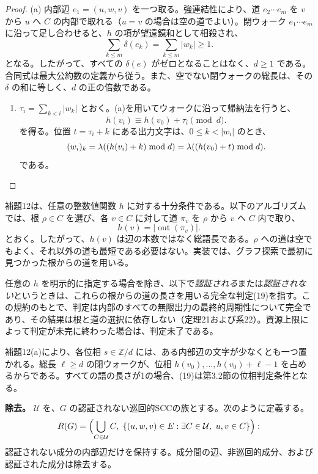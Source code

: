 \documentclass[11pt,reqno]{amsart}
\theoremstyle{definition}
\theoremstyle{definition}
\theoremstyle{remark}
\providecommand{\tightlist}{\setlength{\itemsep}{0pt}\setlength{\parskip}{0pt}}
\begin{document}
\begin{proof}\leavevmode\label{proof:12}
(a) 内部辺 \(e_1=(u,w,v)\) を一つ取る。強連結性により、道 \(e_2\cdots e_m\) を \(v\) から \(u\) へ \(C\) の内部で取れる（\(u=v\) の場合は空の道でよい）。閉ウォーク \(e_1\cdots e_m\) に沿って足し合わせると、\(h\) の項が望遠鏡和として相殺され、
\[
\sum_{k\le m}\delta(e_k)=\sum_{k\le m}|w_k|\ge1.
\]
となる。したがって、すべての \(\delta(e)\) がゼロとなることはなく、\(d\ge1\) である。合同式は最大公約数の定義から従う。また、空でない閉ウォークの総長は、その \(\delta\) の和に等しく、\(d\) の正の倍数である。

\begin{enumerate}
\def\labelenumi{(\alph{enumi})}
\setcounter{enumi}{1}
\tightlist
\item
  \(\tau_i=\sum_{k<i}|w_k|\) とおく。(a)を用いてウォークに沿って帰納法を行うと、
  \[
  h(v_i)\equiv h(v_0)+\tau_i\pmod d.
  \]
  を得る。位置 \(t=\tau_i+k\) にある出力文字は、\(0\le k<|w_i|\) のとき、
  \[
  (w_i)_k=\lambda((h(v_i)+k)\bmod d)=\lambda((h(v_0)+t)\bmod d).\qedhere
\]
  である。
\end{enumerate}
\end{proof}

補題12は、任意の整数値関数 \(h\) に対する十分条件である。以下のアルゴリズムでは、根 \(\rho\in C\) を選び、各 \(v\in C\) に対して道 \(\pi_v\) を \(\rho\) から \(v\) へ \(C\) 内で取り、
\[
h(v)=|\operatorname{out}(\pi_v)|.
\]
とおく。したがって、\(h(v)\) は辺の本数ではなく総語長である。\(\rho\) への道は空でもよく、それ以外の道も最短である必要はない。実装では、グラフ探索で最初に見つかった根からの道を用いる。

任意の \(h\) を明示的に指定する場合を除き、以下で\emph{認証される}または\emph{認証されない}というときは、これらの根からの道の長さを用いる完全な判定(19)を指す。この規約のもとで、判定は内部のすべての無限出力の最終的周期性について完全であり、その結果は根と道の選択に依存しない（定理21および系22）。資源上限によって判定が未完に終わった場合は、判定未了である。

補題12(a)により、各位相 \(s\in\mathbb Z/d\) には、ある内部辺の文字が少なくとも一つ置かれる。総長 \(\ell\ge d\) の閉ウォークが、位相 \(h(v_0),\ldots,h(v_0)+\ell-1\) を占めるからである。すべての語の長さが1の場合、(19)は第3.2節の位相判定条件となる。

\textbf{除去。} \(\mathcal U\) を、\(G\) の認証されない巡回的SCCの族とする。次のように定義する。
\[
R(G)=\Bigl(\bigcup_{C\in\mathcal U}C,\
\{(u,w,v)\in E:\exists C\in\mathcal U,\ u,v\in C\}\Bigr):
\]
認証されない成分の内部辺だけを保持する。成分間の辺、非巡回的成分、および認証された成分は除去する。
\end{document}
